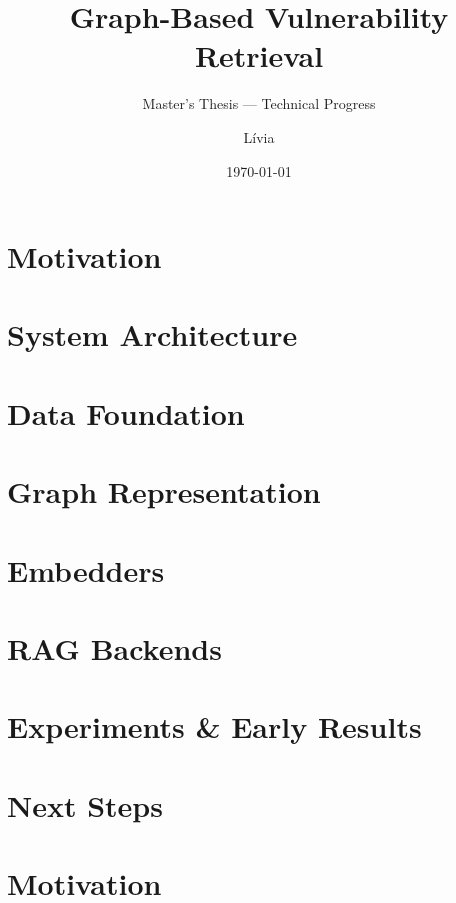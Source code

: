 \documentclass[aspectratio=169,10pt]{beamer}
\title{\textbf{Graph-Based Vulnerability Retrieval}\\[4pt]}
\subtitle{Master's Thesis — Technical Progress}
\author{Lívia}
\institute{TU Munich · Siemens}
\date{\today}
\begin{document}
\begin{frame}
\titlepage
\end{frame}


\section{Motivation}
\section{System Architecture}
\section{Data Foundation}
\section{Graph Representation}
\section{Embedders}
\section{RAG Backends}
\section{Experiments \& Early Results}
\section{Next Steps}

\section{Motivation}
\end{document}
